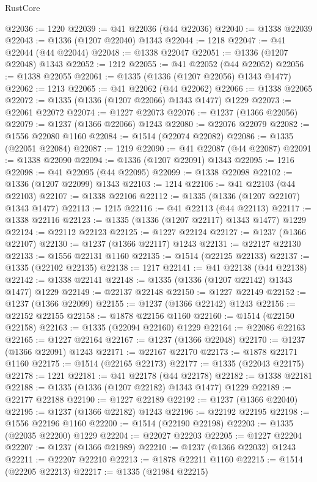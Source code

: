 \begin{lexlean}{RustCore}
\begin{coremodule}
@22036 := 1220
@22039 := @41 @22036 (@44 @22036)
@22040 := @1338 @22039
@22043 := @1336 (@1207 @22040) @1343
@22044 := 1218
@22047 := @41 @22044 (@44 @22044)
@22048 := @1338 @22047
@22051 := @1336 (@1207 @22048) @1343
@22052 := 1212
@22055 := @41 @22052 (@44 @22052)
@22056 := @1338 @22055
@22061 := @1335 (@1336 (@1207 @22056) @1343 @1477)
@22062 := 1213
@22065 := @41 @22062 (@44 @22062)
@22066 := @1338 @22065
@22072 := @1335 (@1336 (@1207 @22066) @1343 @1477) @1229
@22073 := @22061 @22072
@22074 := @1227 @22073
@22076 := @1237 (@1366 @22056)
@22079 := @1237 (@1366 @22066) @1243
@22080 := @22076 @22079
@22082 := @1556 @22080 @1160
@22084 := @1514 (@22074 @22082)
@22086 := @1335 (@22051 @22084)
@22087 := 1219
@22090 := @41 @22087 (@44 @22087)
@22091 := @1338 @22090
@22094 := @1336 (@1207 @22091) @1343
@22095 := 1216
@22098 := @41 @22095 (@44 @22095)
@22099 := @1338 @22098
@22102 := @1336 (@1207 @22099) @1343
@22103 := 1214
@22106 := @41 @22103 (@44 @22103)
@22107 := @1338 @22106
@22112 := @1335 (@1336 (@1207 @22107) @1343 @1477)
@22113 := 1215
@22116 := @41 @22113 (@44 @22113)
@22117 := @1338 @22116
@22123 := @1335 (@1336 (@1207 @22117) @1343 @1477) @1229
@22124 := @22112 @22123
@22125 := @1227 @22124
@22127 := @1237 (@1366 @22107)
@22130 := @1237 (@1366 @22117) @1243
@22131 := @22127 @22130
@22133 := @1556 @22131 @1160
@22135 := @1514 (@22125 @22133)
@22137 := @1335 (@22102 @22135)
@22138 := 1217
@22141 := @41 @22138 (@44 @22138)
@22142 := @1338 @22141
@22148 := @1335 (@1336 (@1207 @22142) @1343 @1477) @1229
@22149 := @22137 @22148
@22150 := @1227 @22149
@22152 := @1237 (@1366 @22099)
@22155 := @1237 (@1366 @22142) @1243
@22156 := @22152 @22155
@22158 := @1878 @22156 @1160
@22160 := @1514 (@22150 @22158)
@22163 := @1335 (@22094 @22160) @1229
@22164 := @22086 @22163
@22165 := @1227 @22164
@22167 := @1237 (@1366 @22048)
@22170 := @1237 (@1366 @22091) @1243
@22171 := @22167 @22170
@22173 := @1878 @22171 @1160
@22175 := @1514 (@22165 @22173)
@22177 := @1335 (@22043 @22175)
@22178 := 1221
@22181 := @41 @22178 (@44 @22178)
@22182 := @1338 @22181
@22188 := @1335 (@1336 (@1207 @22182) @1343 @1477) @1229
@22189 := @22177 @22188
@22190 := @1227 @22189
@22192 := @1237 (@1366 @22040)
@22195 := @1237 (@1366 @22182) @1243
@22196 := @22192 @22195
@22198 := @1556 @22196 @1160
@22200 := @1514 (@22190 @22198)
@22203 := @1335 (@22035 @22200) @1229
@22204 := @22027 @22203
@22205 := @1227 @22204
@22207 := @1237 (@1366 @21989)
@22210 := @1237 (@1366 @22032) @1243
@22211 := @22207 @22210
@22213 := @1878 @22211 @1160
@22215 := @1514 (@22205 @22213)
@22217 := @1335 (@21984 @22215)

\end{coremodule}
\end{lexlean}
